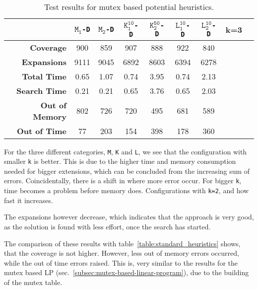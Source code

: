 \begin{table}[h!]
    \begin{center}
        \begin{tabular}{|r|c|c|c|c|c|c|c|c|}
            \hline
            & \textbf{$\texttt{M}_\texttt{1}$\texttt{-D}} & \textbf{$\texttt{M}_\texttt{2}$\texttt{-D}} & \textbf{$\texttt{K}_\texttt{1}^\texttt{10}$\texttt{-D}} & \textbf{$\texttt{K}_\texttt{2}^\texttt{50}$\texttt{-D}} & \textbf{$\texttt{L}_\texttt{1}^\texttt{10}$\texttt{-D}} & \textbf{$\texttt{L}_\texttt{2}^\texttt{10}$\texttt{-D}} & k=3\\
            \hline \hline
            \textbf{Coverage} & 900 & 859 & 907 & 888 & 922 & 840 & \\ \hline
            \textbf{Expansions} & 9111 & 9045 & 6892 & 8603 & 6394 & 6278 & \\ \hline
            \textbf{Total Time} & 0.65 & 1.07 & 0.74 & 3.95 & 0.74 & 2.13 & \\ \hline
            \textbf{Search Time} & 0.21 & 0.21 & 0.65 & 3.76 & 0.65 & 2.03 & \\ \hline
            \textbf{Out of Memory} & 802 & 726 & 720 & 495 & 681 & 589 & \\ \hline
            \textbf{Out of Time} & 77 & 203 & 154 & 398 & 178 & 360 & \\ \hline
        \end{tabular}
        \caption{Test results for mutex based potential heuristics.}
        \label{table:mutex_based_heuristics}
    \end{center}
\end{table}

For the three different categories, \texttt{M}, \texttt{K} and \texttt{L}, we see that the configuration with smaller \texttt{k} is better.
This is due to the higher time and memory consumption needed for bigger extensions, which can be concluded from the increasing sum of errors.
Coincidentally, there is a shift in where more error occur.
For bigger \texttt{k}, time becomes a problem before memory does.
Configurations with \texttt{k=2}, and how fast it increases.

The expansions however decrease, which indicates that the approach is very good, as the solution is found with less effort, once the search has started.

The comparison of these results with table~\ref{table:standard_heuristics} shows, that the coverage is not higher.
However, less out of memory errors occurred, while the out of time errors raised.
This is, very similar to the results for the mutex based LP (sec.~\ref{subsec:mutex-based-linear-program}), due to the building of the mutex table.


